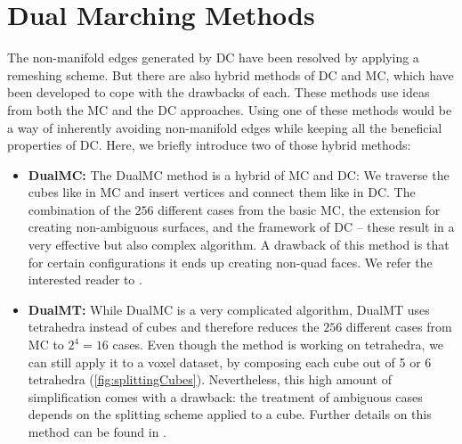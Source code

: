 \section{Dual Marching Methods}
The non-manifold edges generated by \ac{DC} have been resolved by applying a remeshing scheme. But there are also hybrid methods of \ac{DC} and \ac{MC}, which have been developed to cope with the drawbacks of each. These methods use ideas from both the \ac{MC} and the \ac{DC} approaches. Using one of these methods would be a way of inherently avoiding non-manifold edges while keeping all the beneficial properties of \ac{DC}. Here, we briefly introduce two of those hybrid methods:
\begin{itemize}
\item \textbf{\acl{DualMC}:}
The \acf{DualMC} method is a hybrid of \ac{MC} and \ac{DC}: We traverse the cubes like in \ac{MC} and insert vertices and connect them like in \ac{DC}. The combination of the $256$ different cases from the basic \ac{MC}, the extension for creating non-ambiguous surfaces, and the framework of \ac{DC} -- these result in a very effective but also complex algorithm. A drawback of this method is that for certain configurations it ends up creating non-\ac{quad} faces. We refer the interested reader to  \cite{Nielson2004, Zhang2012,ScottSchaefer2004}.

\item \textbf{\acl{DualMT}:}
While \ac{DualMC} is a very complicated algorithm, \acf{DualMT} uses tetrahedra instead of cubes and therefore reduces the $256$ different cases from \ac{MC} to $2^4=16$ cases.
Even though the method is working on tetrahedra, we can still apply it to a voxel dataset, by composing each cube out of 5 or 6 tetrahedra (\autoref{fig:splittingCubes}). Nevertheless, this high amount of simplification comes with a drawback: the treatment of ambiguous cases depends on the splitting scheme applied to a cube. Further details on this method can be found in \cite{Nielson2008}.

\end{itemize}

